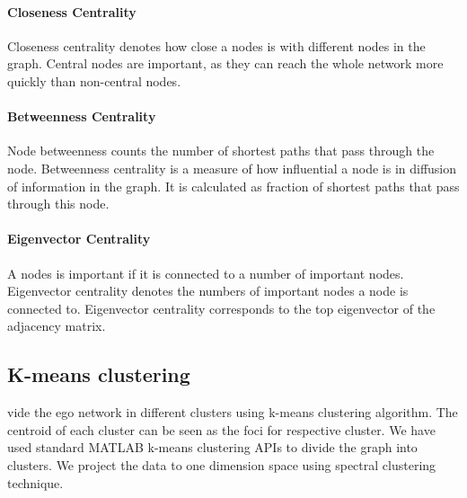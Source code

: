 \paragraph{Closeness Centrality}
Closeness centrality denotes how close a nodes is with different
nodes in the graph.  Central nodes are important, as they can reach
the whole network more quickly than non-central nodes.


\paragraph{Betweenness Centrality}
Node betweenness counts the number of shortest paths that pass through
the node. Betweenness centrality is a measure of how influential a
node is in diffusion of information in the graph.  It is calculated as
fraction of shortest paths that pass through this node.

\paragraph{Eigenvector Centrality}
A nodes is important if it is connected to a number of important
nodes.  Eigenvector centrality denotes the numbers of important nodes
a node is connected to.  Eigenvector centrality corresponds to the
top eigenvector of the adjacency matrix.

\subsection{K-means clustering}
vide the ego network in different clusters using k-means clustering
algorithm.  The centroid of each cluster can be seen as the foci for
respective cluster.  We have used standard MATLAB k-means clustering
APIs to divide the graph into clusters.  We project the data to one
dimension space using spectral clustering technique.


